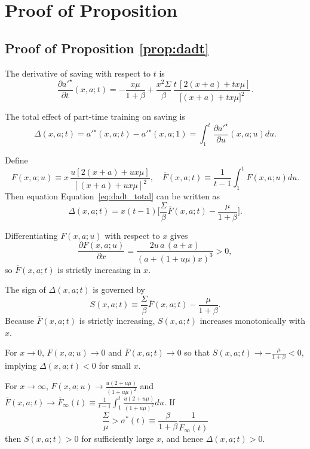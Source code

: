 \documentclass[12pt,english]{article}
\numberwithin{equation}{section}
\let\originaleqref\eqref
\renewcommand{\eqref}{Equation~\originaleqref}
\begin{document}
{\section{Proof of Proposition} \label{appsec: proofs}
\subsection{Proof of Proposition \ref{prop:dadt}}
The derivative of saving with respect to $t$ is
\begin{equation}
\frac{\partial a'^\star}{\partial t}(x,a;t)
=
-\frac{x\mu}{1+\beta}
+
\frac{x^2 \Sigma}{\beta}\,
\frac{t\,[2(x+a) + t x \mu]}{\big[(x+a) + t x \mu\big]^2}.
\label{eq:dadlambda_partial}
\end{equation}

The total effect of part-time training on saving is
\begin{equation}
    \Delta(x,a;t) = a'^\star(x,a;t) - a'^\star(x,a;1) = \int_1^t \frac{\partial a'^\star}{\partial u}(x,a;u) du. \label{eq:dadt_total}
\end{equation}

Define
\[
F(x,a;u)\equiv x\,\frac{u[2(x+a)+u x \mu]}{[(x+a)+u x \mu]^2}, \quad \overline{F}(x,a;t)\equiv \frac{1}{t-1}\int_1^t F(x,a;u) du.
\]
Then equation \eqref{eq:dadt_total} can be written as
\[
    \Delta(x,a;t)
= x(t-1)\Big[\frac{\Sigma}{\beta}\overline{F}(x,a;t)-\frac{\mu}{1+\beta}\Big].
\]

Differentiating $F(x,a;u)$ with respect to $x$ gives
\[
\frac{\partial F(x,a;u)}{\partial x}
=
\frac{2u\,a\,(a+x)}{(a+ (1+u\mu) x)^3}
>0,
\]
so $\overline{F}(x,a;t)$ is strictly increasing in $x$.

The sign of $\Delta(x,a;t)$ is governed by
\[
S(x,a;t)\equiv \frac{\Sigma}{\beta}\overline{F}(x,a;t)-\frac{\mu}{1+\beta}.
\]
Because $\overline{F}(x,a;t)$ is strictly increasing, $S(x,a;t)$ increases monotonically with $x$. 

For $x\to 0$, $F(x,a;u)\to 0$ and $\overline{F}(x,a;t) \to 0$ so that $S(x,a;t)\to - \frac{\mu}{1+\beta}<0$, implying $\Delta(x,a;t)<0$ for small $x$.

For $x\to \infty$, $F(x,a;u)\to \frac{u(2+u\mu)}{(1+u\mu)^2}$ and $\overline{F}(x,a;t) \to \overline{F}_\infty(t)\equiv \frac{1}{t-1}\int_1^t \frac{u(2+u\mu)}{(1+u\mu)^2} du$. If 
\begin{equation}
\frac{\Sigma}{\mu} > \sigma^*(t) \equiv \frac{\beta}{1+\beta}\frac{1}{\overline{F}_\infty(t)}
\label{app:Klowerbound}
\end{equation}
then $S(x,a;t)>0$ for sufficiently large $x$, and hence $\Delta(x,a;t)>0$.

}
\end{document}
